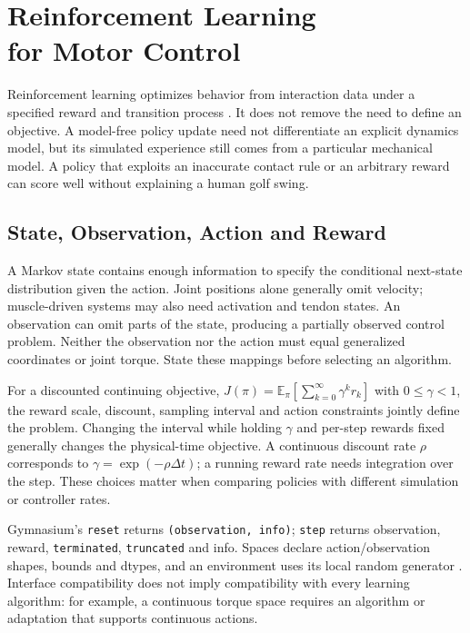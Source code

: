 \chapter[Reinforcement Learning for Motor Control]{Reinforcement Learning\\for Motor Control}
\label{ch:rl}

Reinforcement learning optimizes behavior from interaction data under a specified
reward and transition process \cite{Sutton2018}. It does not remove the need to
define an objective. A model-free policy update need not differentiate an
explicit dynamics model, but its simulated experience still comes from a
particular mechanical model. A policy that exploits an inaccurate contact rule
or an arbitrary reward can score well without explaining a human golf swing.

\section{State, Observation, Action and Reward}

A Markov state contains enough information to specify the conditional next-state
distribution given the action. Joint positions alone generally omit velocity;
muscle-driven systems may also need activation and tendon states. An observation
can omit parts of the state, producing a partially observed control problem.
Neither the observation nor the action must equal generalized coordinates or
joint torque. State these mappings before selecting an algorithm.

For a discounted continuing objective,
$J(\pi)=\mathbb{E}_{\pi}[\sum_{k=0}^{\infty}\gamma^k r_k]$ with
$0\leq\gamma<1$, the reward scale, discount, sampling interval and action
constraints jointly define the problem. Changing the interval while holding
$\gamma$ and per-step rewards fixed generally changes the physical-time
objective. A continuous discount rate $\rho$ corresponds to
$\gamma=\exp(-\rho\Delta t)$; a running reward rate needs integration over
the step. These choices matter when comparing policies with different
simulation or controller rates.

Gymnasium's \texttt{reset} returns \texttt{(observation, info)};
\texttt{step} returns observation, reward, \texttt{terminated},
\texttt{truncated} and info. Spaces declare action/observation shapes, bounds
and dtypes, and an environment uses its local random generator
\cite{GymnasiumEnvironmentReview}. Interface compatibility does not imply
compatibility with every learning algorithm: for example, a continuous torque
space requires an algorithm or adaptation that supports continuous actions.

